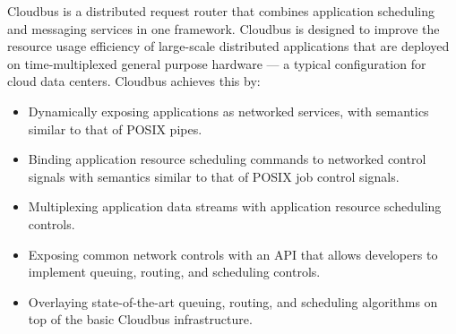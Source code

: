 Cloudbus is a distributed request router that combines application scheduling and messaging services in one framework. Cloudbus is designed %
to improve the resource usage efficiency of large-scale distributed applications that are deployed on time-multiplexed general purpose %
hardware --- a typical configuration for cloud data centers. Cloudbus achieves this by:
\begin{itemize}
	\item Dynamically exposing applications as networked services, with semantics similar to that of POSIX pipes.
	\item Binding application resource scheduling commands to networked control signals with semantics similar to that of POSIX job %
	control signals.
	\item Multiplexing application data streams with application resource scheduling controls.
	\item Exposing common network controls with an API that allows developers to implement queuing, routing, and scheduling %
	controls.
	\item Overlaying state-of-the-art queuing, routing, and scheduling algorithms on top of the basic Cloudbus infrastructure.
\end{itemize}